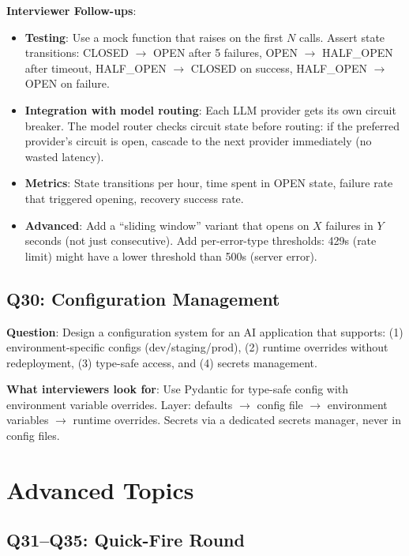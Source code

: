 \textbf{Interviewer Follow-ups}:
\begin{itemize}[leftmargin=*]
    \item \textbf{Testing}: Use a mock function that raises on the first $N$ calls. Assert state transitions: CLOSED $\to$ OPEN after 5 failures, OPEN $\to$ HALF\_OPEN after timeout, HALF\_OPEN $\to$ CLOSED on success, HALF\_OPEN $\to$ OPEN on failure.
    \item \textbf{Integration with model routing}: Each LLM provider gets its own circuit breaker. The model router checks circuit state before routing: if the preferred provider's circuit is open, cascade to the next provider immediately (no wasted latency).
    \item \textbf{Metrics}: State transitions per hour, time spent in OPEN state, failure rate that triggered opening, recovery success rate.
    \item \textbf{Advanced}: Add a ``sliding window'' variant that opens on $X$ failures in $Y$ seconds (not just consecutive). Add per-error-type thresholds: 429s (rate limit) might have a lower threshold than 500s (server error).
\end{itemize}

\subsection{Q30: Configuration Management}

\textbf{Question}: Design a configuration system for an AI application that supports: (1) environment-specific configs (dev/staging/prod), (2) runtime overrides without redeployment, (3) type-safe access, and (4) secrets management.

\textbf{What interviewers look for}: Use Pydantic  for type-safe config with environment variable overrides. Layer: defaults $\to$ config file $\to$ environment variables $\to$ runtime overrides. Secrets via a dedicated secrets manager, never in config files.


\section{Advanced Topics}

\subsection{Q31--Q35: Quick-Fire Round}

